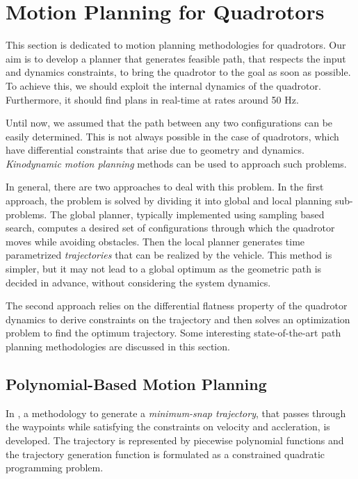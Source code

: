 \section{Motion Planning for Quadrotors}
\label{sec:planning_quadrotors}
This section is dedicated to motion planning methodologies for quadrotors. 
Our aim is to develop a planner that generates feasible path, that respects the input and dynamics constraints, to bring the quadrotor to the goal as soon as possible. To achieve this, we should exploit the internal dynamics of the quadrotor. Furthermore, it should find plans in real-time at rates around 50 Hz. 

Until now, we assumed that the path between any two configurations can be easily determined. This is not always possible in the case of quadrotors, which have differential constraints that arise due to geometry and dynamics. \textit{Kinodynamic motion planning} \cite{donald1993kinodynamic} methods can be used to approach such problems. 

In general, there are two approaches to deal with this problem. In the first approach, the problem is solved by dividing it into global and local planning sub-problems. The global planner, typically implemented using sampling based search, computes a desired set of configurations through which the quadrotor moves while avoiding obstacles. Then the local planner generates time parametrized \textit{trajectories} that can be realized by the vehicle. This method is simpler, but it may not lead to a global optimum as the geometric path is decided in advance, without considering the system dynamics. 

The second approach relies on the differential flatness \cite{mellinger2011minimum} property of the quadrotor dynamics to derive constraints on the trajectory and then solves an optimization problem to find the optimum trajectory. Some interesting state-of-the-art path planning methodologies are discussed in this section. 
\subsection{Polynomial-Based Motion Planning}
\label{sec:poly_based_planning}
In \cite{mellinger2011minimum}, a methodology to generate a \textit{minimum-snap trajectory}, that passes through the waypoints while satisfying the constraints on velocity and accleration, is developed. The trajectory is represented by piecewise polynomial functions and the trajectory generation function is formulated as a constrained quadratic programming problem. 


